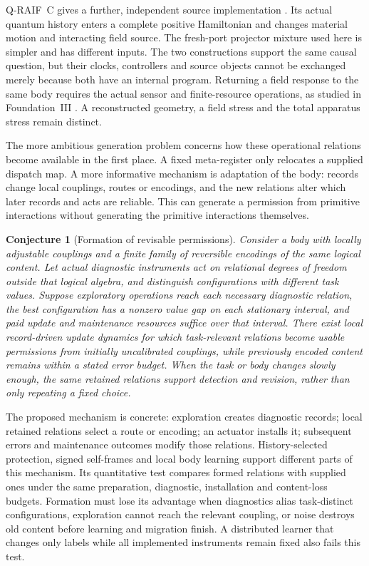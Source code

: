 \documentclass[12pt,a4paper]{article}
\newtheorem{conjecture}[theorem]{Conjecture}
\begin{document}
Q-RAIF~C gives a further, independent source implementation \cite{Liu2026QRAIFC}. Its actual quantum history enters a complete positive Hamiltonian and changes material motion and interacting field source. The fresh-port projector mixture used here is simpler and has different inputs. The two constructions support the same causal question, but their clocks, controllers and source objects cannot be exchanged merely because both have an internal program. Returning a field response to the same body requires the actual sensor and finite-resource operations, as studied in Foundation~III \cite{FoundationIII}. A reconstructed geometry, a field stress and the total apparatus stress remain distinct.

The more ambitious generation problem concerns how these operational relations become available in the first place. A fixed meta-register only relocates a supplied dispatch map. A more informative mechanism is adaptation of the body: records change local couplings, routes or encodings, and the new relations alter which later records and acts are reliable. This can generate a permission from primitive interactions without generating the primitive interactions themselves.

\begin{conjecture}[Formation of revisable permissions]
\label{conj:permissions}
Consider a body with locally adjustable couplings and a finite family of reversible encodings of the same logical content. Let actual diagnostic instruments act on relational degrees of freedom outside that logical algebra, and distinguish configurations with different task values. Suppose exploratory operations reach each necessary diagnostic relation, the best configuration has a nonzero value gap on each stationary interval, and paid update and maintenance resources suffice over that interval. There exist local record-driven update dynamics for which task-relevant relations become usable permissions from initially uncalibrated couplings, while previously encoded content remains within a stated error budget. When the task or body changes slowly enough, the same retained relations support detection and revision, rather than only repeating a fixed choice.
\end{conjecture}

The proposed mechanism is concrete: exploration creates diagnostic records; local retained relations select a route or encoding; an actuator installs it; subsequent errors and maintenance outcomes modify those relations. History-selected protection, signed self-frames and local body learning support different parts of this mechanism. Its quantitative test compares formed relations with supplied ones under the same preparation, diagnostic, installation and content-loss budgets. Formation must lose its advantage when diagnostics alias task-distinct configurations, exploration cannot reach the relevant coupling, or noise destroys old content before learning and migration finish. A distributed learner that changes only labels while all implemented instruments remain fixed also fails this test.
\end{document}
